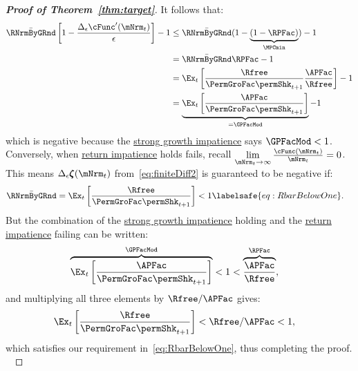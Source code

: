 \documentclass[\econtexRoot/BufferStockTheory]{subfiles}
\begin{document}
\begin{proof}[\textbf{Proof of Theorem~\ref{thm:target}}]
%
It follows that:
%
\begin{align*}
  \bar{\RNrmByGRnd}\left[1-\frac{\Delta_{\epsilon}\cFunc^{\prime}({\mNrm}_t)}{\epsilon}\right]- 1 & \leq  \bar{\RNrmByGRnd}(1-\underbrace{(1-\RPFac)}_{\MPCmin}) - 1  \\
                                                            & = \bar{\RNrmByGRnd}\RPFac - 1 \\
                                                            & = \Ex_{t}\left[\frac{\Rfree}{\PermGroFac \permShk_{t+1}}\frac{\APFac}{\Rfree}\right] - 1 \\
                                                            & = \underbrace{\Ex_{t}\left[\frac{\APFac}{\PermGroFac \permShk_{t+1}}\right]}_{= \GPFacMod} - 1 
\end{align*}
%
which is negative because the \hyperlink{GICMod}{strong growth impatience} says $\GPFacMod < 1$.
Conversely, when \hyperlink{RIC}{return impatience} holds fails, recall $\lim\limits_{\mNrm_{t} \rightarrow \infty} \frac{\cFunc(\mNrm_{t})}{\mNrm_{t}} = 0$.
This means $ \Delta_{\epsilon}\difFunc(\mNrm_{t})$ from~\eqref{eq:finiteDiff2} is guaranteed to be negative if:
%
\begin{equation}\begin{gathered}\begin{aligned}
  \bar{\RNrmByGRnd} = \Ex_{t}\left[\frac{\Rfree}{\PermGroFac \permShk_{t+1}}\right] & < 1  \labelsafe{eq:RbarBelowOne}.
\end{aligned}\end{gathered}\end{equation}
%
But the combination of the \hyperlink{GICMod}{strong growth impatience} holding and the \hyperlink{RIC}{return impatience} failing can be written:
%
\begin{equation}\begin{gathered}\begin{aligned}\label{eq:GICStrRICfailst1}
  \overbrace{\Ex_{t}\left[\frac{\APFac}{\PermGroFac \permShk_{t+1}}\right]}^{\GPFacMod} & < 1 < \overbrace{\frac{\APFac}{\Rfree}}^{{\RPFac}},
\end{aligned}\end{gathered}\end{equation}
%
and multiplying all three elements by $\Rfree/\APFac$ gives:
%
\begin{equation}\begin{gathered}\begin{aligned}\label{eq:GICStrRICfailst2}
  \Ex_{t}\left[\frac{\Rfree}{\PermGroFac \permShk_{t+1}}\right] & < \Rfree/\APFac < 1,
\end{aligned}\end{gathered}\end{equation}
%
which satisfies our requirement in~\eqref{eq:RbarBelowOne}, thus completing the proof.
\



\end{proof}
  
\end{document}
